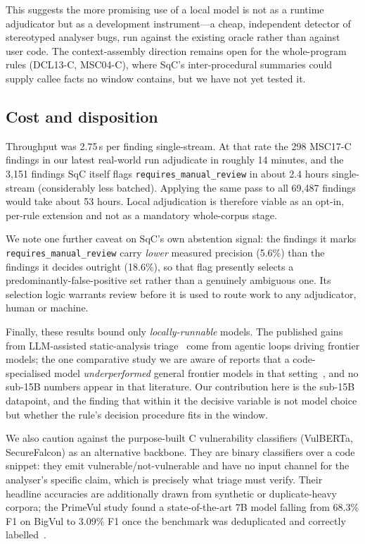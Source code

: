 This suggests the more promising use of a local model is not as a
runtime adjudicator but as a development instrument---a cheap,
independent detector of stereotyped analyser bugs, run against the
existing oracle rather than against user code.  The context-assembly
direction remains open for the whole-program rules (DCL13-C, MSC04-C),
where SqC's inter-procedural summaries could supply callee facts no
window contains, but we have not yet tested it.

\subsection{Cost and disposition}

Throughput was 2.75\,s per finding single-stream.  At that rate the 298
MSC17-C findings in our latest real-world run adjudicate in roughly 14
minutes, and the 3,151 findings SqC itself flags
\texttt{requires\_manual\_review} in about 2.4 hours single-stream
(considerably less batched).  Applying the same pass to all 69,487
findings would take about 53 hours.  Local adjudication is therefore
viable as an opt-in, per-rule extension and not as a mandatory
whole-corpus stage.

We note one further caveat on SqC's own abstention signal: the findings
it marks \texttt{requires\_manual\_review} carry \emph{lower} measured
precision (5.6\%) than the findings it decides outright (18.6\%), so
that flag presently selects a predominantly-false-positive set rather
than a genuinely ambiguous one.  Its selection logic warrants review
before it is used to route work to any adjudicator, human or machine.

Finally, these results bound only \emph{locally-runnable} models.  The
published gains from LLM-assisted static-analysis
triage~\cite{zerofalse,pathfeasibility} come from agentic loops driving
frontier models; the one comparative study we are aware of reports that
a code-specialised model \emph{underperformed} general frontier models
in that setting~\cite{siftingnoise}, and no sub-15B numbers appear in
that literature.  Our contribution here is the sub-15B datapoint, and
the finding that within it the decisive variable is not model choice
but whether the rule's decision procedure fits in the window.

We also caution against the purpose-built C vulnerability classifiers
(VulBERTa, SecureFalcon) as an alternative backbone.  They are binary
classifiers over a code snippet: they emit vulnerable/not-vulnerable
and have no input channel for the analyser's specific claim, which is
precisely what triage must verify.  Their headline accuracies are
additionally drawn from synthetic or duplicate-heavy corpora; the
PrimeVul study found a state-of-the-art 7B model falling from 68.3\%
F1 on BigVul to 3.09\% F1 once the benchmark was
deduplicated and correctly labelled~\cite{primevul}.

